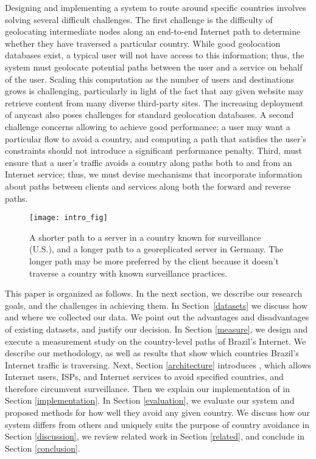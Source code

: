 Designing and implementing a system to route around specific countries
involves solving several difficult challenges. The first challenge is
the difficulty of geolocating intermediate nodes along an end-to-end
Internet path to determine whether they have traversed a particular
country. While good geolocation databases exist, a typical user will not
have access to this information; thus, the system must geolocate
potential paths between the user and a service on behalf of the
user. Scaling this computation as the number of users and destinations grows
is challenging, particularly in light of the fact that any given website
may retrieve content from many diverse third-party sites. The increasing
deployment of anycast also poses challenges for standard geolocation
databases.    A
second challenge concerns allowing \system{} to achieve good
performance; a user may want a particular flow to avoid a country, and
computing a path that satisfies the user's constraints should not
introduce a significant performance penalty. Third, \system{} must
ensure that a user's traffic avoids a country along paths both to and
from an Internet service; thus, we must devise mechanisms that
incorporate information about paths between clients and services along
both the forward and reverse paths.



\begin{figure}[t]
\centering
\texttt{[image: intro\_fig]}
\caption{A shorter path to a server in a country known for surveillance (U.S.), and a longer path to a georeplicated server in Germany.  The longer path may be more preferred by the client because it doesn't traverse a country with known surveillance practices.}
\label{fig:intro}
\end{figure}

This paper is organized as follows.  In the next section, we describe
our research goals, and the challenges in achieving them.  In
Section~\ref{datasets} we discuss how and where we collected our data.
We point out the advantages and disadvantages of existing datasets, and
justify our decision.  In Section \ref{measure}, we design and execute a
measurement study on the country-level paths of Brazil's Internet.  We
describe our methodology, as well as results that show which countries
Brazil's Internet traffic is traversing.  Next, Section
\ref{architecture} introduces \system{}, which allows Internet users, ISPs,
and Internet services to avoid specified countries, and therefore
circumvent surveillance.  Then we explain our implementation of \system{}
in Section \ref{implementation}.  In Section \ref{evaluation}, we
evaluate our system and proposed methods for how well they avoid any
given country.  We discuss how our system differs from others and
uniquely suits the purpose of country avoidance in Section
\ref{discussion}, we review related work in Section \ref{related}, and
conclude in Section \ref{conclusion}. 
